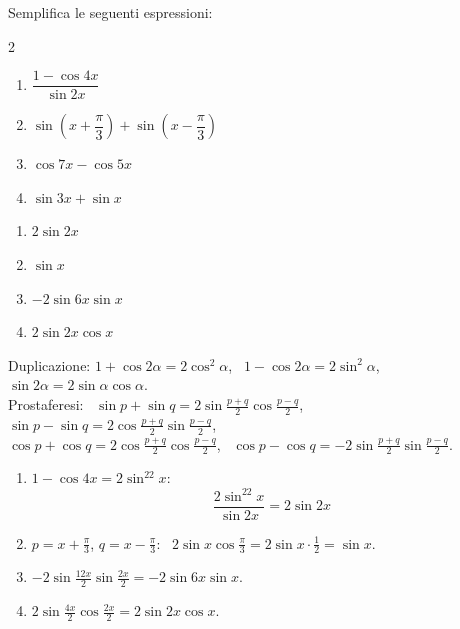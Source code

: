 
\begin{question}[ID=2.4, subtitle={Semplificazione con duplicazione e prostaferesi (variante)}, tags={goniometria, formule di duplicazione, prostaferesi}, difficulty=facile]
Semplifica le seguenti espressioni:
\begin{multicols}{2}
\begin{enumerate}
\item $\dfrac{1 - \cos 4x}{\sin 2x}$
\item $\sin\!\left(x + \dfrac{\pi}{3}\right) + \sin\!\left(x - \dfrac{\pi}{3}\right)$
\item $\cos 7x - \cos 5x$
\item $\sin 3x + \sin x$
\end{enumerate}
\end{multicols}
\begin{solution}
\begin{enumerate}
    \item $2\sin2x$
    \item $\sin x$
    \item $-2\sin6x\sin x$
    \item $2\sin2x\cos x$
\end{enumerate}
\end{solution}
\begin{explanation}
Duplicazione: $1+\cos2\alpha=2\cos^2\alpha$, \ $1-\cos2\alpha=2\sin^2\alpha$, \ $\sin2\alpha=2\sin\alpha\cos\alpha$. \\
Prostaferesi: \ $\sin p+\sin q=2\sin\tfrac{p+q}{2}\cos\tfrac{p-q}{2}$, \ $\sin p-\sin q=2\cos\tfrac{p+q}{2}\sin\tfrac{p-q}{2}$, \\
$\cos p+\cos q=2\cos\tfrac{p+q}{2}\cos\tfrac{p-q}{2}$, \ $\cos p-\cos q=-2\sin\tfrac{p+q}{2}\sin\tfrac{p-q}{2}$.
\begin{enumerate}
    \item $1-\cos4x=2\sin^22x$:
    \[ \dfrac{2\sin^22x}{\sin2x}=2\sin2x \]
    \item $p=x+\tfrac\pi3$, $q=x-\tfrac\pi3$: \ $2\sin x\cos\tfrac\pi3=2\sin x\cdot\tfrac12=\sin x$.
    \item $-2\sin\tfrac{12x}{2}\sin\tfrac{2x}{2}=-2\sin6x\sin x$.
    \item $2\sin\tfrac{4x}{2}\cos\tfrac{2x}{2}=2\sin2x\cos x$.
\end{enumerate}
\end{explanation}
\end{question}

